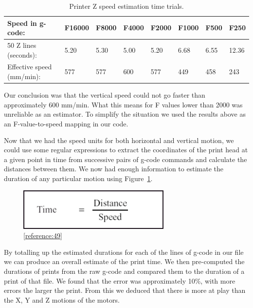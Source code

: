 \documentclass[11pt]{report} %
\begin{document}
\begin{table}[h]{\begin{minipage}{\textwidth}
\begin{tabular}{| l || l | l | l | l | l | l | l |}
\hline
Speed in g-code: & F16000 & F8000 & F4000 & F2000 & F1000 & F500 & F250 \\\hline
50 Z lines (seconds): & 5.20 & 5.30 & 5.00 & 5.20 & 6.68 & 6.55 & 12.36 \\\hline
Effective speed (mm/min): & 577 & 577 & 600 & 577 & 449 & 458 & 243 \\\hline

\end{tabular}
\caption{Printer Z speed estimation time trials.}
\label{table:speedTimes}
\end{minipage} }
\end{table}

Our conclusion was that the vertical speed could not go faster than approximately 600 mm/min. What this means for F values lower than 2000 was unreliable as an estimator. To simplify the situation we used the results above as an F-value-to-speed mapping in our code.

Now that we had the speed units for both horizontal and vertical motion, we could use some regular expressions to extract the coordinates of the print head at a given point in time from successive pairs of g-code commands and calculate the distances between them. We now had enough information to estimate the duration of any particular motion using Figure~\ref{figure:TDS}.

\begin{figure}[H]
  \centering
  \includegraphics[width=3in]{TDS.png}
  \caption{\ref{reference:49}}
  \label{figure:TDS}
\end{figure}

By totalling up the estimated durations for each of the lines of g-code in our file we can produce an overall estimate of the print time. We then pre-computed the durations of prints from the raw g-code and compared them to the duration of a print of that file. We found that the error was approximately 10\%, with more errors the larger the print. From this we deduced that there is more at play than the X, Y and Z motions of the motors.
\end{document}
